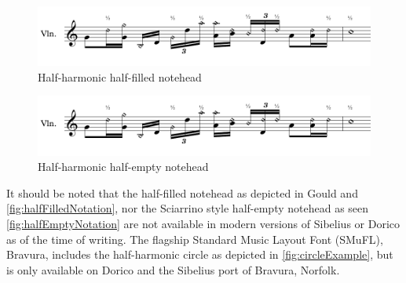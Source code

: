 \begin{figure}
  \includegraphics[page=5,width=\textwidth]{resources/halfharmonicsSingleExamples.pdf}
  \caption{Half-harmonic half-filled notehead}\label{fig:halfFilledNotation}
\end{figure}


\begin{figure}
  \includegraphics[page=2,width=\textwidth]{resources/halfharmonicsSingleExamples.pdf}
  \caption{Half-harmonic half-empty notehead}\label{fig:halfEmptyNotation}
\end{figure}








It should be noted that the half-filled notehead as depicted in Gould and \autoref{fig:halfFilledNotation}, nor the Sciarrino style half-empty notehead as seen \autoref{fig:halfEmptyNotation} are not available in modern versions of Sibelius or Dorico as of the time of writing.\autocite[424]{gouldBars2011}
The flagship Standard Music Layout Font (SMuFL), Bravura, includes the half-harmonic circle as depicted in \autoref{fig:circleExample}, but is only available on Dorico and the Sibelius port of Bravura, Norfolk.\autocite[]{w3ccommitteeStandardMusicFont2019}

